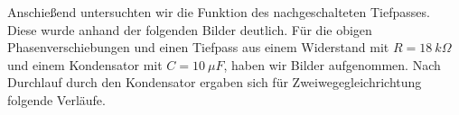 \documentclass{scrartcl}						%
\begin{document}
			Anschießend untersuchten wir die Funktion des nachgeschalteten Tiefpasses. Diese wurde anhand der folgenden Bilder deutlich. Für die obigen Phasenverschiebungen und einen Tiefpass aus einem Widerstand mit $ R=18\ k\Omega $ und einem Kondensator mit $ C=10 \ \mu F $, haben wir Bilder aufgenommen. Nach Durchlauf durch den Kondensator ergaben sich für Zweiwegegleichrichtung folgende Verläufe.
			 \begin{figure}[h!]
			 \end{figure}
\end{document}
